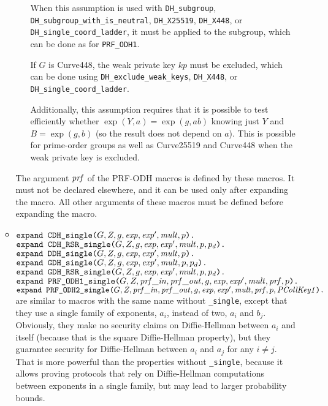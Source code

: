 \documentclass{article}
\begin{document}
\begin{itemize}
\begin{itemize}
\begin{itemize}
       When this assumption is used with \texttt{DH\_subgroup}, \texttt{DH\_subgroup\_with\_is\_neutral}, \texttt{DH\_X25519},
       \texttt{DH\_X448}, or \texttt{DH\_single\_coord\_ladder}, it
       must be applied to the subgroup, which can be done as for \texttt{PRF\_ODH1}.

       If $G$ is Curve448, the weak private key $kp$ must be excluded,
       which can be done using \texttt{DH\_exclude\_weak\_keys}, \texttt{DH\_X448},
       or \texttt{DH\_single\_coord\_ladder}.

Additionally, this assumption requires that it is possible to test
efficiently whether $\exp(Y,a) = \exp(g, ab)$ knowing just $Y$ and
$B = \exp(g,b)$ (so the result does not depend on $a$). This is possible
for prime-order groups as well as Curve25519 and Curve448 when
the weak private key is excluded.


     \end{itemize}
     The argument $\mathit{prf}$ of the PRF-ODH macros is defined by these
     macros.  It must not be declared elsewhere, and it can be used
     only after expanding the macro.  All other arguments of these
     macros must be defined before expanding the macro.
     
     \item $\texttt{expand\ CDH\_single(}G, Z, g, \mathit{exp}, \mathit{exp}', \mathit{mult}, p\texttt{).}$\\
       $\texttt{expand\ CDH\_RSR\_single(}G, Z, g, \mathit{exp}, \mathit{exp}', \mathit{mult}, p, p_d\texttt{).}$\\
       $\texttt{expand\ DDH\_single(}G, Z, g, \mathit{exp}, \mathit{exp}', \mathit{mult}, p\texttt{).}$\\
       $\texttt{expand\ GDH\_single(}G, Z, g, \mathit{exp}, \mathit{exp}', \mathit{mult}, p, p_d\texttt{).}$\\
       $\texttt{expand\ GDH\_RSR\_single(}G, Z, g, \mathit{exp}, \mathit{exp}', \mathit{mult}, p, p_d\texttt{).}$\\
       $\texttt{expand\ PRF\_ODH1\_single(}G, Z, \mathit{prf\_in}, \mathit{prf\_out}, g, \mathit{exp}, \mathit{exp}', \mathit{mult}, \mathit{prf}, p\texttt{).}$\\
       $\texttt{expand\ PRF\_ODH2\_single(}G, Z, \mathit{prf\_in}, \mathit{prf\_out}, g, \mathit{exp}, \mathit{exp}', \mathit{mult}, \mathit{prf}, p, \mathit{PCollKey1}\texttt{).}$\\
       are similar to macros with the same name without \texttt{\_single}, except that they use a single family of exponents, $a_i$, instead of two, $a_i$ and $b_j$. Obviously, they make no security claims on Diffie-Hellman between $a_i$ and itself (because that is the square Diffie-Hellman property), but they guarantee security for Diffie-Hellman between $a_i$ and $a_j$ for any $i \neq j$. That is more powerful than the properties without \texttt{\_single}, because it allows proving protocols that rely on Diffie-Hellman computations between exponents in a single family, but may lead to larger probability bounds.
       

\end{itemize}
\end{itemize}
\end{document}
